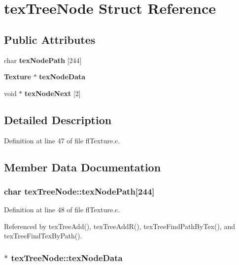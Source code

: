 \section{tex\-Tree\-Node Struct Reference}
\label{structtexTreeNode}
\subsection*{Public Attributes}
\begin{CompactItemize}
\item 
char {\bf tex\-Node\-Path} [244]
\item 
{\bf Texture} $\ast$ {\bf tex\-Node\-Data}
\item 
void $\ast$ {\bf tex\-Node\-Next} [2]
\end{CompactItemize}


\subsection{Detailed Description}




Definition at line 47 of file fl\-Texture.c.

\subsection{Member Data Documentation}
\subsubsection{\setlength{\rightskip}{0pt plus 5cm}char {\bf tex\-Tree\-Node::tex\-Node\-Path}[244]}\label{structtexTreeNode_f9e6fb8236cd2eddc8be752d16825cf2}




Definition at line 48 of file fl\-Texture.c.

Referenced by tex\-Tree\-Add(), tex\-Tree\-Add\-R(), tex\-Tree\-Find\-Path\-By\-Tex(), and tex\-Tree\-Find\-Tex\-By\-Path().
\subsubsection{$\ast$ {\bf tex\-Tree\-Node::tex\-Node\-Data}}\label{structtexTreeNode_066740a23b2d736ce00a72976d40ead2}




